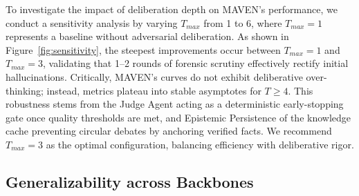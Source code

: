 \documentclass{article}
\begin{document}
To investigate the impact of deliberation depth on MAVEN's performance, we conduct a sensitivity analysis by varying $T_{max}$ from 1 to 6, where $T_{max}=1$ represents a baseline without adversarial deliberation. As shown in Figure~\ref{fig:sensitivity}, the steepest improvements occur between $T_{max}=1$ and $T_{max}=3$, validating that 1--2 rounds of forensic scrutiny effectively rectify initial hallucinations. Critically, MAVEN's curves do not exhibit deliberative over-thinking; instead, metrics plateau into stable asymptotes for $T \ge 4$. This robustness stems from the Judge Agent acting as a deterministic early-stopping gate once quality thresholds are met, and Epistemic Persistence of the knowledge cache preventing circular debates by anchoring verified facts. We recommend $T_{max}=3$ as the optimal configuration, balancing efficiency with deliberative rigor.

\subsection{Generalizability across Backbones}
\label{subsec:backbone_generalization}
\end{document}
